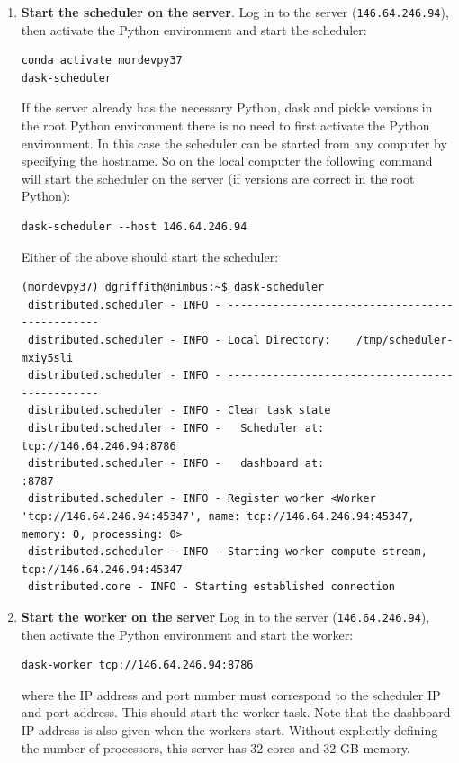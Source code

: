 \begin{enumerate}
\item \textbf{Start the scheduler on the server}. Log in to the server (\lstinline{146.64.246.94}), then activate the Python environment and start the scheduler:

\begin{lstlisting}
conda activate mordevpy37
dask-scheduler
\end{lstlisting}

If the server already has the necessary Python, dask and pickle versions in the root Python environment there is no need to first activate the Python environment.  In this case the scheduler can be started from any computer by specifying the hostname. So on the local computer the following command will start the scheduler on the server (if versions are correct in the root Python):

\begin{lstlisting}
dask-scheduler --host 146.64.246.94
\end{lstlisting}

Either of the above should start the scheduler:
\begin{lstlisting}[style=tinysize]
(mordevpy37) dgriffith@nimbus:~$ dask-scheduler
 distributed.scheduler - INFO - -----------------------------------------------
 distributed.scheduler - INFO - Local Directory:    /tmp/scheduler-mxiy5sli
 distributed.scheduler - INFO - -----------------------------------------------
 distributed.scheduler - INFO - Clear task state
 distributed.scheduler - INFO -   Scheduler at:  tcp://146.64.246.94:8786
 distributed.scheduler - INFO -   dashboard at:                     :8787
 distributed.scheduler - INFO - Register worker <Worker 'tcp://146.64.246.94:45347', name: tcp://146.64.246.94:45347, memory: 0, processing: 0>
 distributed.scheduler - INFO - Starting worker compute stream, tcp://146.64.246.94:45347
 distributed.core - INFO - Starting established connection
\end{lstlisting}

\item \textbf{Start the worker on the server}  Log in to the server (\lstinline{146.64.246.94}), then activate the Python environment and start the worker:        

\begin{lstlisting}
dask-worker tcp://146.64.246.94:8786
\end{lstlisting}

where the IP address and port number must correspond to the scheduler IP and port address. This should start the worker task. Note that the dashboard IP address is also given when the workers start. Without explicitly defining the number of processors, this server has 32 cores and 32 \ac{GB} memory.    


\end{enumerate}
